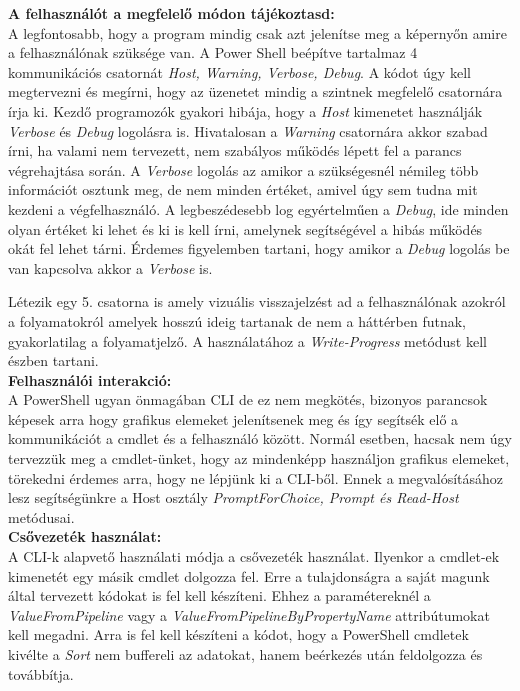 \documentclass[12pt,oneside,justify,table]{book}
\begin{document}
\noindent \textbf{A felhasználót a megfelelő módon tájékoztasd:} \\
A legfontosabb, hogy a program mindig csak azt jelenítse meg a képernyőn amire a felhasználónak szüksége van. A Power Shell beépítve tartalmaz 4 kommunikációs csatornát \textit{Host, Warning, Verbose, Debug}. A kódot úgy kell megtervezni és megírni, hogy az üzenetet mindig a szintnek megfelelő csatornára írja ki. Kezdő programozók gyakori hibája, hogy a \textit{Host} kimenetet használják  \textit{Verbose} és \textit{Debug} logolásra is.  Hivatalosan a \textit{Warning} csatornára akkor szabad írni, ha valami nem tervezett, nem szabályos működés lépett fel a parancs végrehajtása során. A \textit{Verbose} logolás az amikor a szükségesnél némileg több információt osztunk meg, de nem minden értéket, amivel úgy sem tudna mit kezdeni a végfelhasználó. A legbeszédesebb log egyértelműen a \textit{Debug}, ide minden olyan értéket ki lehet és ki is kell írni, amelynek segítségével a hibás működés okát fel lehet tárni. Érdemes figyelemben tartani, hogy amikor a \textit{Debug} logolás be van kapcsolva akkor a \textit{Verbose} is. 

Létezik egy 5. csatorna is amely vizuális visszajelzést ad a felhasználónak azokról a folyamatokról amelyek hosszú ideig tartanak de nem a háttérben futnak, gyakorlatilag a folyamatjelző. A használatához a \textit{Write-Progress} metódust kell észben tartani.\\

\noindent \textbf{Felhasználói interakció:}\\
A PowerShell ugyan önmagában CLI de ez nem megkötés, bizonyos parancsok képesek arra hogy grafikus elemeket jelenítsenek meg és így segítsék elő a kommunikációt a cmdlet és a felhasználó között. Normál esetben, hacsak nem úgy tervezzük meg a cmdlet-ünket, hogy az mindenképp használjon grafikus elemeket, törekedni érdemes arra, hogy ne lépjünk ki a CLI-ből. Ennek a megvalósításához lesz segítségünkre a Host osztály \textit{PromptForChoice, Prompt és Read-Host} metódusai.\\

\noindent \textbf{Csővezeték használat:} \\
A CLI-k alapvető használati módja a csővezeték használat. Ilyenkor a cmdlet-ek kimenetét egy másik cmdlet dolgozza fel. Erre a tulajdonságra a saját magunk által tervezett kódokat is fel kell készíteni. Ehhez a paramétereknél a \textit{ValueFromPipeline} vagy a \textit{ValueFromPipelineByPropertyName} attribútumokat kell megadni. Arra is fel kell készíteni a kódot, hogy a PowerShell cmdletek kivélte a \textit{Sort} nem buffereli az adatokat, hanem beérkezés után feldolgozza és továbbítja. \\
\end{document}
